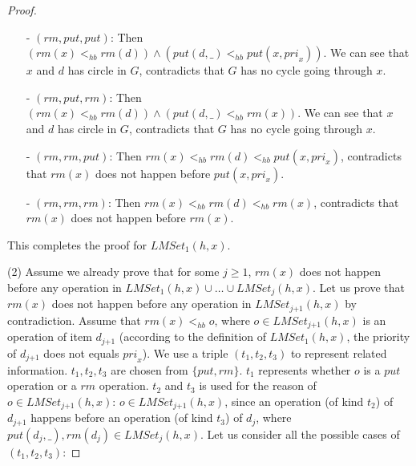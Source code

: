 \begin {proof}
\begin{itemize}
\item[-] $(\textit{rm},\textit{put},\textit{put})$: Then $( \textit{rm}(x) <_{hb} \textit{rm}(d) ) \wedge ( \textit{put}(d,\_) <_{hb} \textit{put}(x,\textit{pri}_x) )$. We can see that $x$ and $d$ has circle in $G$, contradicts that $G$ has no cycle going through $x$.

\item[-] $(\textit{rm},\textit{put},\textit{rm})$: Then $( \textit{rm}(x) <_{hb} \textit{rm}(d) ) \wedge ( \textit{put}(d,\_) <_{hb} \textit{rm}(x) )$. We can see that $x$ and $d$ has circle in $G$, contradicts that $G$ has no cycle going through $x$.

\item[-] $(\textit{rm},\textit{rm},\textit{put})$: Then $\textit{rm}(x) <_{hb} \textit{rm}(d) <_{hb} \textit{put}(x,\textit{pri}_x)$, contradicts that $\textit{rm}(x)$ does not happen before $\textit{put}(x,\textit{pri}_x)$.

\item[-] $(\textit{rm},\textit{rm},\textit{rm})$: Then $\textit{rm}(x) <_{hb} \textit{rm}(d) <_{hb} \textit{rm}(x)$, contradicts that $\textit{rm}(x)$ does not happen before $\textit{rm}(x)$.
\end{itemize}

This completes the proof for $\textit{LMSet}_1(h,x)$.

\noindent (2) Assume we already prove that for some $j \geq 1$, $\textit{rm}(x)$ does not happen before any operation in $\textit{LMSet}_1(h,x) \cup \ldots \cup \textit{LMSet}_j(h,x)$. Let us prove that $\textit{rm}(x)$ does not happen before any operation in $\textit{LMSet}_{\textit{j+1}}(h,x)$ by contradiction. Assume that $\textit{rm}(x) <_{hb} o$, where $o \in \textit{LMSet}_{\textit{j+1}}(h,x)$ is an operation of item $d_{\textit{j+1}}$ (according to the definition of $\textit{LMSet}_1(h,x)$, the priority of $d_{\textit{j+1}}$ does not equals $\textit{pri}_x$). We use a triple $(t_1,t_2,t_3)$ to represent related information. $t_1,t_2,t_3$ are chosen from $\{ \textit{put},\textit{rm} \}$. $t_1$ represents whether $o$ is a $\textit{put}$ operation or a $\textit{rm}$ operation. $t_2$ and $t_3$ is used for the reason of $o \in \textit{LMSet}_{\textit{j+1}}(h,x)$: $o \in \textit{LMSet}_{\textit{j+1}}(h,x)$, since an operation (of kind $t_2$) of $d_{\textit{j+1}}$ happens before an operation (of kind $t_3$) of $d_j$, where $\textit{put}(d_j,\_), \textit{rm}(d_j) \in \textit{LMSet}_j(h,x)$. Let us consider all the possible cases of $(t_1,t_2,t_3)$:


\end{proof}
